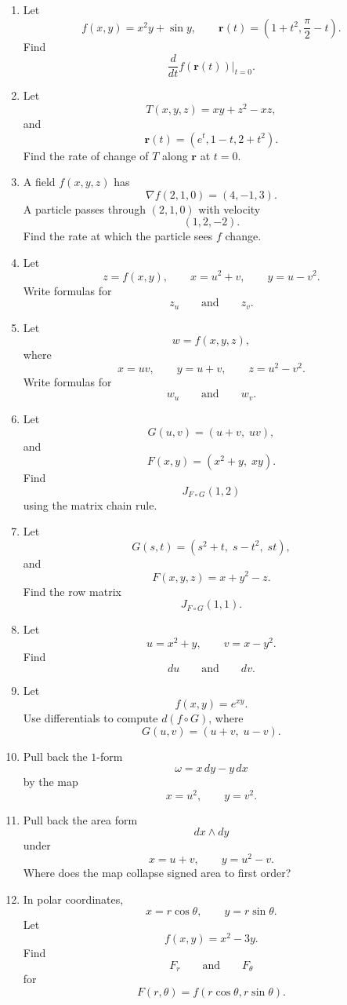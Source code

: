 \begin{enumerate}
\item Let
\[
    f(x,y)=x^2y+\sin y,
    \qquad
    \mathbf r(t)=\left(1+t^2,\frac{\pi}{2}-t\right).
\]
Find
\[
    \frac{d}{dt}f(\mathbf r(t))\bigg|_{t=0}.
\]

\item Let
\[
    T(x,y,z)=xy+z^2-xz,
\]
and
\[
    \mathbf r(t)=(e^t,1-t,2+t^2).
\]
Find the rate of change of \(T\) along \(\mathbf r\) at \(t=0\).

\item A field \(f(x,y,z)\) has
\[
    \nabla f(2,1,0)=(4,-1,3).
\]
A particle passes through \((2,1,0)\) with velocity
\[
    (1,2,-2).
\]
Find the rate at which the particle sees \(f\) change.

\item Let
\[
    z=f(x,y),
    \qquad
    x=u^2+v,
    \qquad
    y=u-v^2.
\]
Write formulas for
\[
    z_u
    \qquad\text{and}\qquad
    z_v.
\]

\item Let
\[
    w=f(x,y,z),
\]
where
\[
    x=uv,\qquad y=u+v,\qquad z=u^2-v^2.
\]
Write formulas for
\[
    w_u
    \qquad\text{and}\qquad
    w_v.
\]

\item Let
\[
    G(u,v)=(u+v,\;uv),
\]
and
\[
    F(x,y)=(x^2+y,\;xy).
\]
Find
\[
    J_{F\circ G}(1,2)
\]
using the matrix chain rule.

\item Let
\[
    G(s,t)=(s^2+t,\;s-t^2,\;st),
\]
and
\[
    F(x,y,z)=x+y^2-z.
\]
Find the row matrix
\[
    J_{F\circ G}(1,1).
\]

\item Let
\[
    u=x^2+y,
    \qquad
    v=x-y^2.
\]
Find
\[
    du
    \qquad\text{and}\qquad
    dv.
\]

\item Let
\[
    f(x,y)=e^{xy}.
\]
Use differentials to compute \(d(f\circ G)\), where
\[
    G(u,v)=(u+v,\;u-v).
\]

\item Pull back the \(1\)-form
\[
    \omega=x\,dy-y\,dx
\]
by the map
\[
    x=u^2,\qquad y=v^2.
\]

\item Pull back the area form
\[
    dx\wedge dy
\]
under
\[
    x=u+v,
    \qquad
    y=u^2-v.
\]
Where does the map collapse signed area to first order?

\item In polar coordinates,
\[
    x=r\cos\theta,
    \qquad
    y=r\sin\theta.
\]
Let
\[
    f(x,y)=x^2-3y.
\]
Find
\[
    F_r
    \qquad\text{and}\qquad
    F_\theta
\]
for
\[
    F(r,\theta)=f(r\cos\theta,r\sin\theta).
\]


\end{enumerate}
